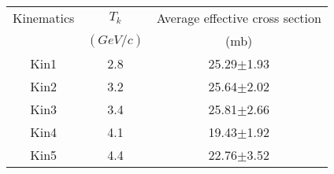 \begin{center}
\begin{tabular}{||c|c|c||}\hline
 Kinematics & $T_k$ & Average effective cross section \\
 & $(GeV/c)$ & (mb)\\\hline
Kin1 & 2.8 &25.29$\pm$1.93 \\
Kin2 & 3.2 &25.64$\pm$2.02 \\
Kin3 & 3.4 &25.81$\pm$2.66 \\
Kin4 & 4.1 &19.43$\pm$1.92 \\
Kin5 & 4.4 &22.76$\pm$3.52 \\\hline
\end{tabular}
\end{center}